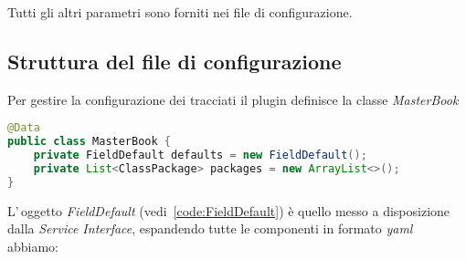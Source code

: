 \documentclass[a4paper,10pt]{report}
\begin{document}
Tutti gli altri parametri sono forniti nei file di configurazione.

\subsection{Struttura del file di configurazione}
Per gestire la configurazione dei tracciati il plugin definisce la classe
\textsl{MasterBook}

\begin{lstlisting}[language=java, caption=classe di configurazione MasterBook, 
label=code:MasterBook]
@Data
public class MasterBook {
    private FieldDefault defaults = new FieldDefault();
    private List<ClassPackage> packages = new ArrayList<>();
}
\end{lstlisting}

L'\,oggetto \textsl{FieldDefault} (vedi~\ref{code:FieldDefault}) è quello messo
a disposizione dalla \textsl{Service Interface}, espandendo tutte le componenti
in formato \textit{yaml} abbiamo:
\end{document}
